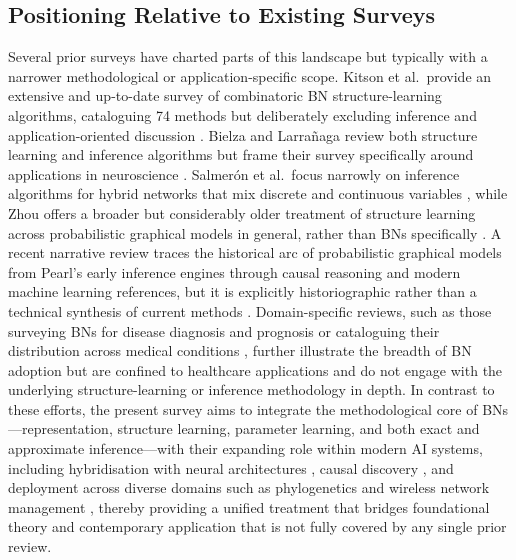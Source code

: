 \subsection{Positioning Relative to Existing Surveys}
Several prior surveys have charted parts of this landscape but typically with a narrower methodological or application-specific scope. Kitson et al.\ provide an extensive and up-to-date survey of combinatoric BN structure-learning algorithms, cataloguing 74 methods but deliberately excluding inference and application-oriented discussion \cite{kitson2023survey}. Bielza and Larra{\~n}aga review both structure learning and inference algorithms but frame their survey specifically around applications in neuroscience \cite{bielza2014bayesian}. Salmer{\'o}n et al.\ focus narrowly on inference algorithms for hybrid networks that mix discrete and continuous variables \cite{salmeron2018review}, while Zhou offers a broader but considerably older treatment of structure learning across probabilistic graphical models in general, rather than BNs specifically \cite{zhou2011structure}. A recent narrative review traces the historical arc of probabilistic graphical models from Pearl's early inference engines through causal reasoning and modern machine learning references, but it is explicitly historiographic rather than a technical synthesis of current methods \cite{revista2026network}. Domain-specific reviews, such as those surveying BNs for disease diagnosis and prognosis \cite{polotskaya2024bayesian} or cataloguing their distribution across medical conditions \cite{mclachlan2020bayesian}, further illustrate the breadth of BN adoption but are confined to healthcare applications and do not engage with the underlying structure-learning or inference methodology in depth. In contrast to these efforts, the present survey aims to integrate the methodological core of BNs---representation, structure learning, parameter learning, and both exact and approximate inference---with their expanding role within modern AI systems, including hybridisation with neural architectures \cite{j2016composing,gal2015bayesian}, causal discovery \cite{nauta2019causal,ebertuphoff2012causal}, and deployment across diverse domains such as phylogenetics \cite{hohna2016revbayes} and wireless network management \cite{shen2020assisted}, thereby providing a unified treatment that bridges foundational theory and contemporary application that is not fully covered by any single prior review.

